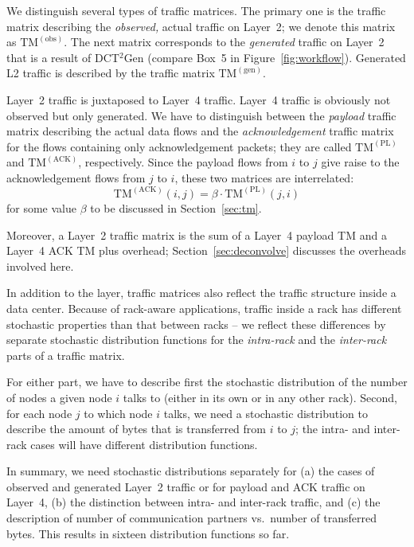 \documentclass[journal,10pt]{IEEEtran}
\newcommand{\genname}{DCT${^2}$Gen}
\newcommand{\lt}{Layer~2}
\newcommand{\lf}{Layer~4}
\newcommand{\obstm}{\ensuremath{\mathrm{TM}^{(\mathrm{obs})}}}
\newcommand{\gentm}{\ensuremath{\mathrm{TM}^{(\mathrm{gen})}}}
\newcommand{\pltm}{\ensuremath{\mathrm{TM}^{(\mathrm{PL})}}}
\newcommand{\acktm}{\ensuremath{\mathrm{TM}^{(\mathrm{ACK})}}}
\begin{document}
We distinguish several types of traffic matrices. The primary one is the traffic matrix describing the \emph{observed,} actual traffic on Layer~2; we denote this matrix as \obstm. The next matrix corresponds to the \emph{generated} traffic on Layer~2 that is a result of \genname{} (compare Box~5 in Figure~\ref{fig:workflow}). Generated L2 traffic is described by the traffic matrix \gentm. 

\lt{} traffic is juxtaposed to \lf{} traffic. \lf{} traffic is obviously not observed but only generated. We have to distinguish between the \emph{payload} traffic matrix describing the actual data flows and the \emph{acknowledgement} traffic matrix for the flows containing only acknowledgement packets; they are called \pltm{} and \acktm, respectively. Since the payload flows from $i$ to $j$ give raise to the acknowledgement flows from $j$ to $i$, these two matrices are interrelated: 
$$ \acktm(i,j) = \beta \cdot \pltm(j,i)$$ \noindent for some value $\beta$ to be discussed in Section~\ref{sec:tm}. 

Moreover, a \lt{} traffic matrix is the sum of a \lf{} payload TM and a \lf{} ACK TM plus overhead; Section~\ref{sec:deconvolve} discusses the overheads involved here. 



In addition to the layer, traffic matrices also reflect the traffic structure inside a data center. 
Because of rack-aware applications, traffic inside a rack has different stochastic properties than that between racks -- we reflect these differences by separate stochastic distribution functions for the \emph{intra-rack} and the \emph{inter-rack} parts of a traffic matrix. 

For either part, we have to describe first the stochastic distribution of the number of nodes a given node $i$ talks to (either in its own or in any other rack). Second, for each node $j$  to which node $i$ talks, we need a stochastic distribution to describe the amount of bytes that is transferred from $i$ to $j$; the intra- and inter-rack cases will have different distribution functions. 

In summary, we need stochastic distributions separately for (a)  the cases of observed and generated \lt{} traffic or for payload and ACK traffic on \lf{}, (b) the distinction between intra- and inter-rack traffic, and (c) the description of number of communication partners vs.\ number of transferred bytes. This results in sixteen distribution functions so far. 
\end{document}
